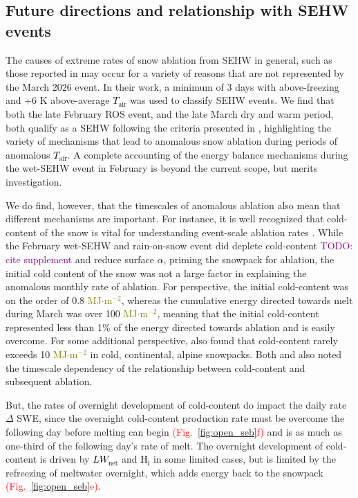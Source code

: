 \documentclass[draft]{agujournal2019}
\newcommand{\fig}[2]{\textcolor{red}{(Fig.~\ref{#1}{#2})}}   %
\newcommand{\todo}[1]{\textcolor{purple}{TODO: #1}}      %
\newcommand{\tair}{\textcolor{black}{$T_{\mathrm{air}}$}\xspace}
\newcommand{\lwnet}{\textcolor{black}{$LW_{\mathrm{net}}$}\xspace}
\newcommand{\hlat}{\textcolor{black}{H$_l$}\xspace}
\newcommand{\albedo}{\textcolor{black}{$\alpha$}\xspace}
\newcommand{\mjmtwo}{\textcolor{olive}{MJ$\cdot$m$^{-2}$}\xspace}
\begin{document}
\subsection{Future directions and relationship with SEHW events}
The causes of extreme rates of snow ablation from SEHW in general, such as those reported in  may occur for a variety of reasons that are not represented by the March 2026 event.
In their work, a minimum of 3 days with above-freezing and +6 K above-average \tair was used to classify SEHW events.
We find that both the late February ROS event, and the late March dry and warm period, both qualify as a SEHW following the criteria presented in , highlighting the variety of mechanisms that lead to anomalous snow ablation during periods of anomalous \tair.
A complete accounting of the energy balance mechanisms during the wet-SEHW event in February is beyond the current scope, but merits investigation.

% 
We do find, however, that the timescales of anomalous ablation also mean that different mechanisms are important.
For instance, it is well recognized that cold-content of the snow is vital for understanding event-scale ablation rates \cite{Katz2023-ga}.
While the February wet-SEHW and rain-on-snow event did deplete cold-content \todo{cite supplement} and reduce surface \albedo, priming the snowpack for ablation, the initial cold content of the snow was not a large factor in explaining the anomalous monthly rate of ablation.
For perspective, the initial cold-content was on the order of 0.8 \mjmtwo, whereas the cumulative energy directed towards melt during March was over 100 \mjmtwo, meaning that the initial cold-content represented less than 1\% of the energy directed towards ablation and is easily overcome.
For some additional perspective,  also found that cold-content rarely exceeds 10 \mjmtwo in cold, continental, alpine snowpacks.
Both  and  also noted the timescale dependency of the relationship between cold-content and subsequent ablation.

But, the rates of overnight development of cold-content do impact the daily rate $\Delta$ SWE, since the overnight cold-content production rate must be overcome the following day before melting can begin \fig{fig:open_seb}{f} and is as much as one-third of the following day's rate of melt.
The overnight development of cold-content is driven by \lwnet and \hlat in some limited cases, but is limited by the refreezing of meltwater overnight, which adds energy back to the snowpack \fig{fig:open_seb}{e}.
\end{document}
